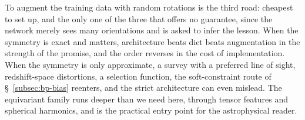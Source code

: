To augment the training data with random rotations is the third road: cheapest to set up, and the only one of the three that offers no guarantee, since the network merely sees many orientations and is asked to infer the lesson. When the symmetry is exact and matters, architecture beats diet beats augmentation in the strength of the promise, and the order reverses in the cost of implementation. When the symmetry is only approximate, a survey with a preferred line of sight, redshift-space distortions, a selection function, the soft-constraint route of \S~\ref{subsec:bp-bias} reenters, and the strict architecture can even mislead. The equivariant family runs deeper than we need here, through tensor features and spherical harmonics, and \citet{Satorras2021_EGNN_equivariant} is the practical entry point for the astrophysical reader.
